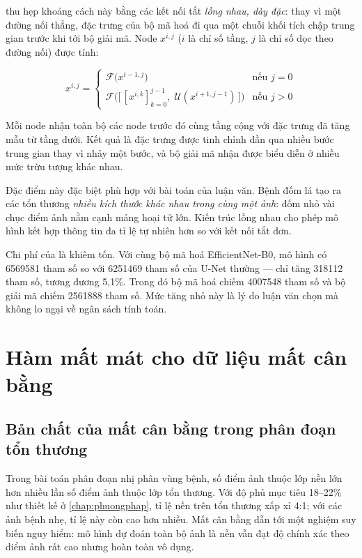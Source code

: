 \UNetpp{} thu hẹp khoảng cách này bằng các kết nối tắt \emph{lồng nhau, dày đặc}:
thay vì một đường nối thẳng, đặc trưng của bộ mã hoá đi qua một chuỗi khối tích
chập trung gian trước khi tới bộ giải mã. Node $x^{i,j}$ ($i$ là chỉ số tầng, $j$
là chỉ số dọc theo đường nối) được tính:

\begin{equation}
    x^{i,j} =
    \begin{cases}
        \mathcal{F}\big(x^{i-1,j}\big) & \text{nếu } j = 0 \\[6pt]
        \mathcal{F}\Big(\big[\,[x^{i,k}]_{k=0}^{j-1},\; \mathcal{U}(x^{i+1,j-1})\,\big]\Big) & \text{nếu } j > 0
    \end{cases}
    \label{eq:unetpp}
\end{equation}

Mỗi node nhận toàn bộ các node trước đó cùng tầng cộng với đặc trưng đã tăng mẫu
từ tầng dưới. Kết quả là đặc trưng được tinh chỉnh dần qua nhiều bước trung gian
thay vì nhảy một bước, và bộ giải mã nhận được biểu diễn ở nhiều mức trừu tượng
khác nhau.

Đặc điểm này đặc biệt phù hợp với bài toán của luận văn. Bệnh đốm lá tạo ra các
tổn thương \emph{nhiều kích thước khác nhau trong cùng một ảnh}: đốm nhỏ vài chục
điểm ảnh nằm cạnh mảng hoại tử lớn. Kiến trúc lồng nhau cho phép mô hình kết hợp
thông tin đa tỉ lệ tự nhiên hơn so với kết nối tắt đơn.

Chi phí của \UNetpp{} là khiêm tốn. Với cùng bộ mã hoá EfficientNet-B0, mô hình
\UNetpp{} có \num{6569581} tham số so với \num{6251469} tham số của U-Net thường
--- chỉ tăng \num{318112} tham số, tương đương 5,1\%. Trong đó bộ mã hoá chiếm
\num{4007548} tham số và bộ giải mã chiếm \num{2561888} tham số. Mức tăng nhỏ này
là lý do luận văn chọn \UNetpp{} mà không lo ngại về ngân sách tính toán.

\section{Hàm mất mát cho dữ liệu mất cân bằng}
\label{sec:loss}

\subsection{Bản chất của mất cân bằng trong phân đoạn tổn thương}

Trong bài toán phân đoạn nhị phân vùng bệnh, số điểm ảnh thuộc lớp nền lớn hơn
nhiều lần số điểm ảnh thuộc lớp tổn thương. Với độ phủ mục tiêu 18--22\% như
thiết kế ở \cref{chap:phuongphap}, tỉ lệ nền trên tổn thương xấp xỉ 4:1; với các
ảnh bệnh nhẹ, tỉ lệ này còn cao hơn nhiều. Mất cân bằng dẫn tới một nghiệm suy
biến nguy hiểm: mô hình dự đoán toàn bộ ảnh là nền vẫn đạt độ chính xác theo điểm
ảnh rất cao nhưng hoàn toàn vô dụng.

